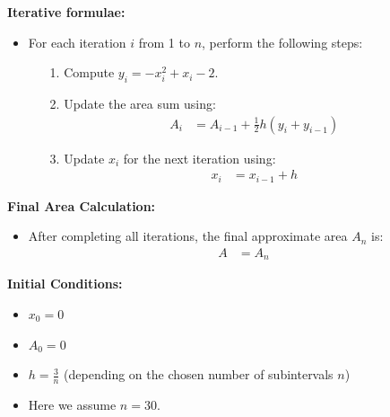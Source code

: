 \documentclass[article]{IEEEtran}
\numberwithin{figure}{enumi}
\begin{document}
\textbf{Iterative formulae:}\\
\begin{itemize}
    \item For each iteration $i$ from 1 to $n$, perform the following steps:
    \begin{itemize}
        \item[1.] Compute $y_i = -x_i^2 + x_i - 2$.
        \item[2.] Update the area sum using:
        \begin{align}
        A_{i} &= A_{i-1} + \frac{1}{2} h (y_{i} + y_{i-1})
        \end{align}
        \item[3.] Update $x_i$ for the next iteration using:
        \begin{align}
        x_{i} &= x_{i-1} + h
        \end{align}
    \end{itemize}
\end{itemize}

\textbf{Final Area Calculation:}\\
\begin{itemize}
    \item After completing all iterations, the final approximate area $A_n$ is:
    \begin{align}
    A &= A_n
    \end{align}
\end{itemize}

\textbf{Initial Conditions:}
\begin{itemize}
    \item $x_0 = 0$
    \item $A_0 = 0$
    \item $h = \frac{3}{n}$ (depending on the chosen number of subintervals $n$)
    \item Here we assume $n = 30$.
\end{itemize}
\end{document}
